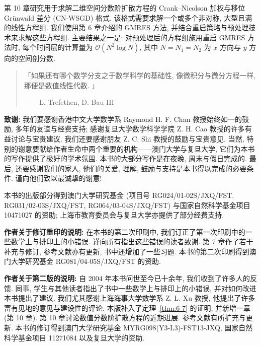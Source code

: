 第 10 章研究用于求解二维空间分数阶扩散方程的 Crank--Nicolson 加权与移位 Grünwald 差分 (CN-WSGD) 格式. 该格式需要求解一个或多个非对称, 大型且满的线性方程组. 我们使用第 6 章介绍的 GMRES 方法, 并结合重启策略与预处理技术来求解这些方程组. 主要结果之一是: 对预处理后的方程组施用重启 GMRES 方法时, 每个时间层的计算量为 $\mathcal{O}(N^{2}\log N)$, 其中 $N=N_{1}=N_{2}$ 为 $x$ 方向与 $y$ 方向的空间剖分数.

\vspace{0.8em}
\begin{quote}
「如果还有哪个数学分支之于数学科学的基础性, 像微积分与微分方程一样, 那便是数值线性代数. 」

\raggedleft ——\,L. Trefethen, D. Bau III
\end{quote}
\vspace{0.8em}

\noindent\textbf{致谢:} 我们要感谢香港中文大学数学系 Raymond H. F. Chan 教授始终如一的鼓励, 多年的友谊与经费支持; 感谢复旦大学数学科学学院 Z. H. Cao 教授的许多有益讨论与宝贵建议. 我们还要感谢朋友 Z. C. Shi 教授的鼓励与宝贵意见. 当然, 特别的谢意要献给作者生命中两个重要的机构——澳门大学与复旦大学, 它们为本书的写作提供了极好的学术氛围. 本书的大部分写作是在夜晚, 周末与假日完成的. 最后, 还要感谢我们的家人, 他们的关爱, 理解, 鼓励与支持是本书得以完成的必要条件. 谨向他们致以最诚挚的谢意!

\begingroup\raggedright
本书的出版部分得到澳门大学研究基金 (项目号 \mbox{RG024/01-02S/JXQ/FST}, \mbox{RG031/02-03S/JXQ/FST}, \mbox{RG064/03-04S/JXQ/FST}) 与国家自然科学基金项目 10471027 的资助; 上海市教育委员会与复旦大学亦提供了部分经费支持.
\par\endgroup

\medskip
\noindent\textbf{作者关于修订重印的说明:} 在本书的第二次印刷中, 我们订正了第一次印刷中的一些数学上与排印上的小错误. 谨向所有指出这些错误的读者致谢. 第 7 章作了若干补充与修订, 参考文献亦有更新, 书中还增加了一些习题. 本书的第二次印刷得到澳门大学研究基金 \mbox{RG081/04-05S/JXQ/FST} 的资助.

\medskip
\noindent\textbf{作者关于第二版的说明:} 自 2004 年本书问世至今已十余年, 我们收到了许多人的反馈. 同事, 学生与其他读者指出了书中一些数学上与排印上的小错误, 并对如何改进本书提出了建议. 我们尤其感谢上海海事大学数学系 Z. L. Xu 教授, 他提出了许多富有见地的意见与建设性的评论. 本版补入了定理~\ref{thm:6-7} 的证明, 并新增一章 (第 10 章). 第 10 章讨论数值分数阶扩散方程的近期进展. 参考文献有所扩充与更新. 本书的修订得到澳门大学研究基金 \mbox{MYRG098(Y3-L3)-FST13-JXQ}, 国家自然科学基金项目 11271084 以及复旦大学的资助.
